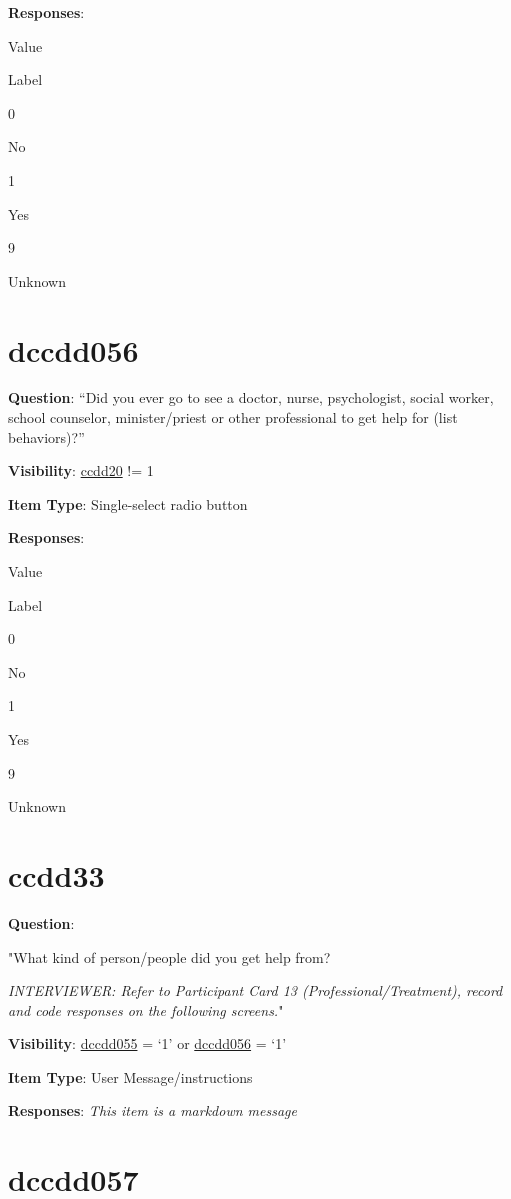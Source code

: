 \documentclass[]{book}
\begin{document}
\textbf{Responses}:

Value

Label

0

No

1

Yes

9

Unknown

\hypertarget{dccdd056}{%
\section{dccdd056}\label{dccdd056}}

\textbf{Question}: ``Did you ever go to see a doctor, nurse, psychologist, social worker, school counselor, minister/priest or other professional to get help for (list behaviors)?''

\textbf{Visibility}: \protect\hyperlink{ccdd20}{ccdd20} != 1

\textbf{Item Type}: Single-select radio button

\textbf{Responses}:

Value

Label

0

No

1

Yes

9

Unknown

\hypertarget{ccdd33}{%
\section{ccdd33}\label{ccdd33}}

\textbf{Question}:

"What kind of person/people did you get help from?

\emph{INTERVIEWER: Refer to Participant Card 13 (Professional/Treatment), record and code responses on the following screens.}"

\textbf{Visibility}: \protect\hyperlink{dccdd055}{dccdd055} = `1' or \protect\hyperlink{dccdd056}{dccdd056} = `1'

\textbf{Item Type}: User Message/instructions

\textbf{Responses}: \emph{This item is a markdown message}

\hypertarget{dccdd057}{%
\section{dccdd057}\label{dccdd057}}
\end{document}
